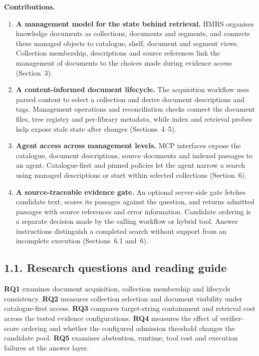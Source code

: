 \noindent\textbf{Contributions.}
\begin{enumerate}
\item \textbf{A management model for the state behind retrieval.} HMRS
organises knowledge documents as collections, documents and segments, and
connects these managed objects to catalogue, shelf, document and segment
views. Collection membership, descriptions and source references link the
management of documents to the choices made during evidence access
(Section~3).
\item \textbf{A content-informed document lifecycle.} The acquisition
workflow uses parsed content to select a collection and derive document
descriptions and tags. Management operations and reconciliation checks
connect the document files, tree registry and per-library metadata, while
index and retrieval probes help expose stale state after changes
(Sections~4--5).
\item \textbf{Agent access across management levels.} MCP interfaces expose
the catalogue, document descriptions, source documents and indexed passages
to an agent. Catalogue-first and pinned policies let the agent narrow a
search using managed descriptions or start within selected collections
(Section~6).
\item \textbf{A source-traceable evidence gate.} An optional server-side
gate fetches candidate text, scores its passages against the question, and
returns admitted passages with source references and error information.
Candidate ordering is a separate decision made by the calling workflow or
hybrid tool. Answer instructions distinguish a completed search without
support from an incomplete execution
(Sections~6.1 and~6).
\end{enumerate}

\subsection{1.1. Research questions and reading guide}


\textbf{RQ1} examines document acquisition, collection membership and
lifecycle consistency. \textbf{RQ2} measures collection selection and
document visibility under catalogue-first access. \textbf{RQ3} compares
target-string containment and retrieval cost across the tested evidence
configurations. \textbf{RQ4} measures the effect of verifier-score ordering
and whether the configured admission threshold changes the candidate pool.
\textbf{RQ5} examines abstention, runtime, tool cost and execution failures
at the answer layer.

